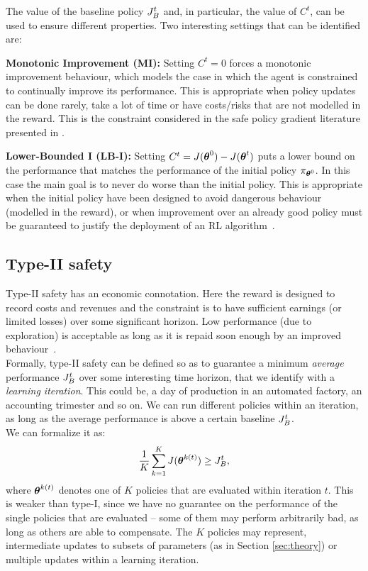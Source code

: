 The value of the baseline policy $\jbase[t]$ and, in particular, the value of $C^t$, can be used to ensure different properties. Two interesting settings that can be identified are:

\textbf{Monotonic Improvement (MI):} Setting $C^t= 0$ forces a monotonic improvement behaviour, which models the case in which the agent is constrained to continually improve its performance. This is appropriate when policy updates can be done rarely, take a lot of time or have costs/risks that are not modelled in the reward. This is the constraint considered in the safe policy gradient literature presented in .

\textbf{Lower-Bounded I (LB-I):}
Setting $C^t = J(\vtheta^0) - J(\vtheta^t)$ puts a lower bound on the performance that matches the performance of the initial policy $\pi_{\vtheta^0}$. In this case the main goal is to never do worse than the initial policy. This is appropriate when the initial policy have been designed to avoid dangerous behaviour (modelled in the reward), or when improvement over an already good policy must be guaranteed to justify the deployment of an RL algorithm~\cite{pmlr-v37-thomas15}.



\subsection{Type-II safety}

Type-II safety has an economic connotation. Here the reward is designed to record costs and revenues and the constraint is to have sufficient earnings (or limited losses) over some significant horizon. Low performance (\eg due to exploration) is acceptable as long as it is repaid soon enough by an improved behaviour~\cite{adaptive_batch}\cite{pmlr-v37-thomas15}.\\
Formally, type-II safety can be defined so as to guarantee a minimum \textit{average} performance $\jbase$ over some interesting time horizon, that we identify with a \textit{learning iteration}. This could be, \eg a day of production in an automated factory, an accounting trimester and so on. We can run different policies within an iteration, as long as the average performance is above a certain baseline $\jbase$.\\
We can formalize it as: 
\begin{align}\label{con:6}
\frac{1}{K}\sum_{k=1}^{K}J(\vtheta^{k(t)}) \geq \jbase,
\end{align}
where $\vtheta^{k(t)}$ denotes one of $K$ policies that are evaluated within iteration $t$. This is weaker than type-I, since we have no guarantee on the performance of the single policies that are evaluated -- some of them may perform arbitrarily bad, as long as others are able to compensate. The $K$ policies may represent, \eg intermediate updates to subsets of parameters (as in Section \ref{sec:theory}) or multiple updates within a learning iteration. 

